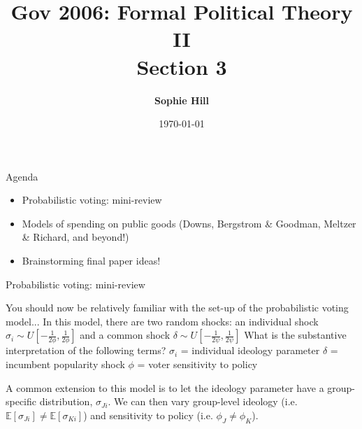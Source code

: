 \documentclass[aspectratio=169]{beamer}
\title{Gov 2006: Formal Political Theory II \\
Section 3}
\date{\today}
\author{ \textbf{Sophie Hill}}
\begin{document}
  \maketitle
  

\begin{frame}{Agenda}



\begin{itemize}
\setlength \itemsep{0.5em}
\item Probabilistic voting: mini-review

\item Models of spending on public goods (Downs, Bergstrom 
\& Goodman, Meltzer \& Richard, and beyond!)

\item Brainstorming final paper ideas!


\end{itemize}

\end{frame}
\begin{frame}{Probabilistic voting: mini-review}

\begin{outline}
\setlength \itemsep{0.5em}
\1 You should now be relatively familiar with the set-up of the probabilistic voting model...
\pause
\1 In this model, there are two random shocks: an \alert{individual} shock $\sigma_i \sim U \left[ -\frac{1}{2 \phi}, \frac{1}{2 \phi} \right] $ and a \alert{common} shock $\delta \sim U \left[ -\frac{1}{2 \psi}, \frac{1}{2 \psi} \right] $
\pause
\1 What is the substantive interpretation of the following terms?
\pause 
\2 $\sigma_i$ \pause = \alert{individual ideology parameter}
\2 $\delta$ \pause = \alert{incumbent popularity shock}
\2 $\phi$ \pause = \alert{voter sensitivity to policy}

\1 A common extension to this model is to let the ideology parameter have a group-specific distribution, $\sigma_{Ji}$. We can then vary group-level ideology (i.e. $\mathbb{E}[\sigma_{Ji}] \neq \mathbb{E}[\sigma_{Ki}] $) and sensitivity to policy (i.e. $\phi_J \neq \phi_K$).

\end{outline}

\end{frame}
\end{document}
